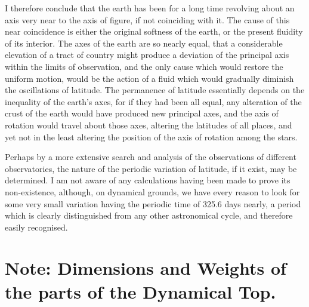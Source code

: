 \documentclass[12pt]{article}
\begin{document}
I therefore conclude that the earth has been for a long time revolving
about an axis very near to the axis of figure, if not coinciding with
it.  The cause of this near coincidence is either the original
softness of the earth, or the present fluidity of its interior.  The
axes of the earth are so nearly equal, that a considerable elevation
of a tract of country might produce a deviation of the principal axis
within the limits of observation, and the only cause which would
restore the uniform motion, would be the action of a fluid which would
gradually diminish the oscillations of latitude.  The permanence of
latitude essentially depends on the inequality of the earth's axes,
for if they had been all equal, any alteration of the crust of the
earth would have produced new principal axes, and the axis of rotation
would travel about those axes, altering the latitudes of all places,
and yet not in the least altering the position of the axis of rotation
among the stars.

Perhaps by a more extensive search and analysis of the observations of
different observatories, the nature of the periodic variation of
latitude, if it exist, may be determined.  I am not aware of any
calculations having been made to prove its non-existence, although, on
dynamical grounds, we have every reason to look for some very small
variation having the periodic time of 325.6 days nearly, a period
which is clearly distinguished from any other astronomical cycle, and
therefore easily recognised.

\section*{Note: Dimensions and Weights of the parts of the Dynamical Top.}
\end{document}
